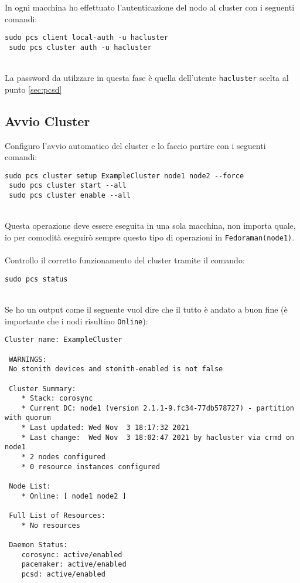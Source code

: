 In ogni macchina ho effettuato l'autenticazione del nodo al cluster con i seguenti comandi:

\begin{lstlisting}[style=cmd]
 sudo pcs client local-auth -u hacluster
 sudo pcs cluster auth -u hacluster
\end{lstlisting}
\ \\
La password da utilzzare in questa fase \`{e} quella dell'utente \lstinline[style=cmd]|hacluster| scelta al punto \autoref{sec:pcsd}

\subsection{Avvio Cluster}

Configuro l'avvio automatico del cluster e lo faccio partire con i seguenti comandi:

\begin{lstlisting}[style=cmd]
 sudo pcs cluster setup ExampleCluster node1 node2 --force
 sudo pcs cluster start --all
 sudo pcs cluster enable --all
\end{lstlisting}
\ \\
Questa operazione deve essere eseguita in una sola macchina, non importa quale, io per comodit\`{a} eseguir\`{o} sempre questo tipo di operazioni in \lstinline[style=cmd]|Fedoraman(node1)|.
\ \\
Controllo il corretto funzionamento del cluster tramite il comando:

\begin{lstlisting}[style=cmd]
 sudo pcs status
\end{lstlisting}
\ \\
Se ho un output come il seguente vuol dire che il tutto \`{e} andato a buon fine (\`{e} importante che i nodi risultino \lstinline[style=cmd]|Online|):

\begin{lstlisting}[style=output]
 Cluster name: ExampleCluster
 
 WARNINGS:
 No stonith devices and stonith-enabled is not false
 
 Cluster Summary:
    * Stack: corosync
    * Current DC: node1 (version 2.1.1-9.fc34-77db578727) - partition with quorum
    * Last updated: Wed Nov  3 18:17:32 2021
    * Last change:  Wed Nov  3 18:02:47 2021 by hacluster via crmd on node1
    * 2 nodes configured
    * 0 resource instances configured
 
 Node List:
    * Online: [ node1 node2 ]
 
 Full List of Resources:
    * No resources
 
 Daemon Status:
    corosync: active/enabled
    pacemaker: active/enabled
    pcsd: active/enabled
\end{lstlisting}

